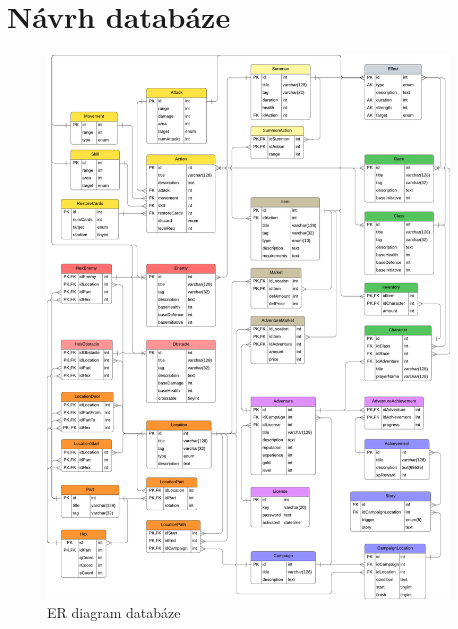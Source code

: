 \chapter{Návrh databáze}\label{sec:dix:database}

\begin{figure}[h]
    \centering
    \includegraphics[width=0.95\textwidth]{../../shared/diagrams/dbScheme.pdf}
    \caption{ER diagram databáze}
    \label{fig:dix:database_schema}
\end{figure}
